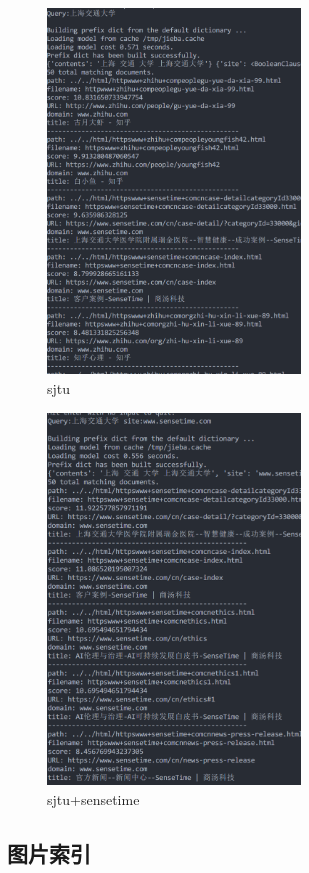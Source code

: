\documentclass[12pt,a4paper]{article}
\begin{document}
\begin{figure}[H]
	\includegraphics[width=0.6\textwidth]{q20.png}
	\centering
	 \caption{sjtu}
\end{figure}
\begin{figure}[H]
	\includegraphics[width=0.6\textwidth]{q21.png}
	\centering
	 \caption{sjtu+sensetime}
\end{figure}
\subsection{图片索引}
\end{document}

